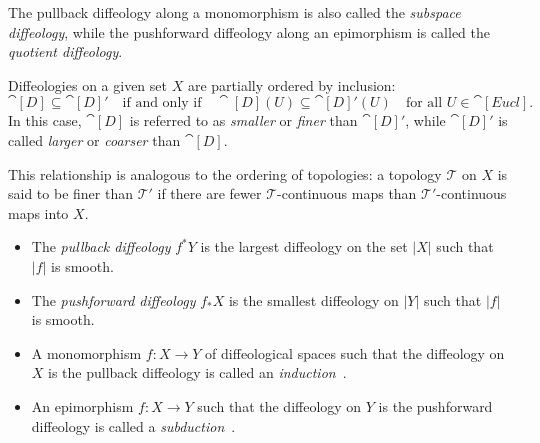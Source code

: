\documentclass[a4paper,11pt]{article}  %
\newcommand{\Eucl}{\cat[Eucl]}
\begin{document}
\begin{definition}
The pullback diffeology along a monomorphism is also called the \emph{subspace diffeology}, while the pushforward diffeology along an epimorphism is called the \emph{quotient diffeology}.
\end{definition}


\begin{remark}%
Diffeologies on a given set $X$ are partially ordered by inclusion:
$$
\cat[D] \subseteq \cat[D]' \quad \text{if and only if} \quad \cat[D](U) \subseteq \cat[D]'(U) \quad \text{for all } U \in \Eucl.
$$
In this case, \(\cat[D]\) is referred to as \emph{smaller} or \emph{finer} than \(\cat[D]'\), while \(\cat[D]'\) is called \emph{larger} or \emph{coarser} than \(\cat[D]\).

This relationship is analogous to the ordering of topologies: a topology \(\mathcal{T}\) on \(X\) is said to be finer than \(\mathcal{T}'\) if there are fewer \(\mathcal{T}\)-continuous maps than \(\mathcal{T}'\)-continuous maps into \(X\).

\end{remark}
\begin{proposition}
\begin{itemize}
    \item The \emph{pullback diffeology} \(f^*Y\) is the largest diffeology on the set \(|X|\) such that \(|f|\) is smooth.
    \item The \emph{pushforward diffeology} \(f_*X\) is the smallest diffeology on \(|Y|\) such that \(|f|\) is smooth.
\end{itemize}
\end{proposition}

\begin{definition}
	\begin{itemize}
		\item A monomorphism \(f : X \to Y\) of diffeological spaces such that the diffeology on \(X\) is the pullback diffeology is called an \emph{induction}~\cite[Sec. 1.29]{IZ13}. 
		\item An epimorphism \(f : X \to Y\) such that the diffeology on \(Y\) is the pushforward diffeology is called a \emph{subduction}~\cite[Sec. 1.46]{IZ13}.

	\end{itemize}
\end{definition}
\end{document}

